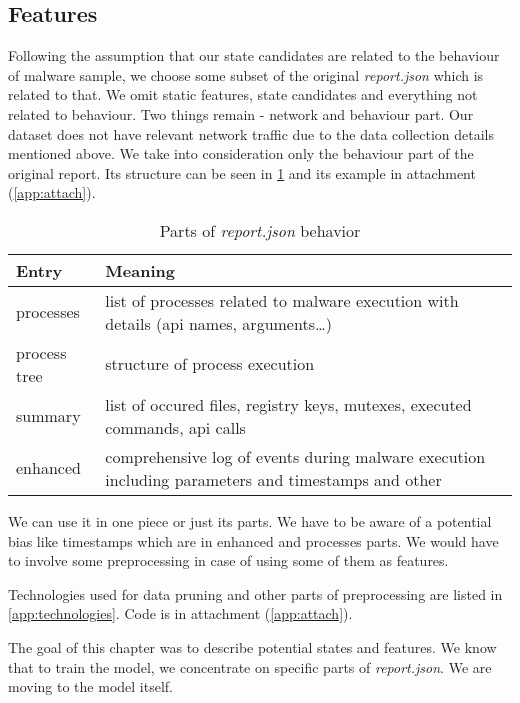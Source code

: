 \subsection{Features}
Following the assumption that our state candidates are related to the behaviour of malware sample, we choose some subset of the original \emph{report.json} which is related to that. We omit static features, state candidates and everything not related to behaviour. Two things remain - network and behaviour part. Our dataset does not have relevant network traffic due to the data collection details mentioned above. We take into consideration only the behaviour part of the original report. Its structure can be seen in \ref{tab:behavioral} and its example in attachment (\ref{app:attach}).

\begin{table}[h]
    \centering
    \caption{Parts of \emph{report.json} behavior}
    \begin{tabular}{p{2cm}p{12cm}} 
        \toprule
        \textbf{Entry} &
        \textbf{Meaning} \\
        \midrule
        processes & list of processes related to malware execution with details (api names, arguments\dots) \\
        \midrule
        process tree & structure of process execution\\
        \midrule
        summary & list of occured files, registry keys, mutexes, executed commands, api calls \\
        \midrule
        enhanced & comprehensive log of events during malware execution including parameters and timestamps and other\\
        \bottomrule
    \end{tabular}
    \label{tab:behavioral}
\end{table}

We can use it in one piece or just its parts. We have to be aware of a potential bias like timestamps which are in enhanced and processes parts. We would have to involve some preprocessing in case of using some of them as features.

Technologies used for data pruning and other parts of preprocessing are listed in \ref{app:technologies}. Code is in attachment (\ref{app:attach}).

The goal of this chapter was to describe potential states and features. We know that to train the model, we concentrate on specific parts of \emph{report.json}. We are moving to the model itself.



